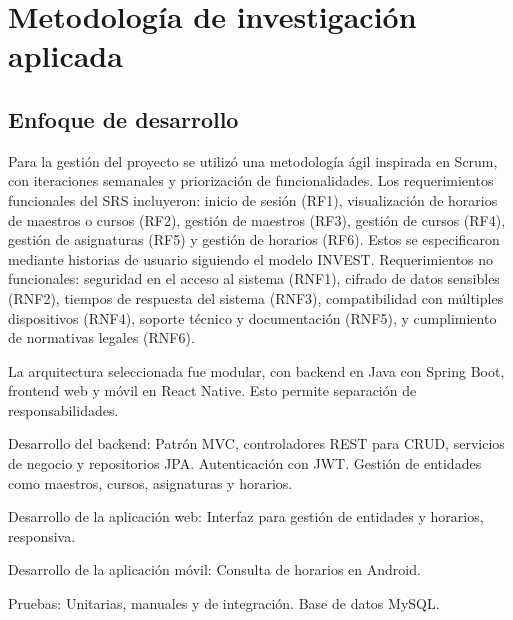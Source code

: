 \section{Metodología de investigación aplicada}
\subsection{Enfoque de desarrollo}
Para la gestión del proyecto se utilizó una metodología ágil inspirada en Scrum, con iteraciones semanales y priorización de funcionalidades. Los requerimientos funcionales del SRS incluyeron: inicio de sesión (RF1), visualización de horarios de maestros o cursos (RF2), gestión de maestros (RF3), gestión de cursos (RF4), gestión de asignaturas (RF5) y gestión de horarios (RF6). Estos se especificaron mediante historias de usuario siguiendo el modelo INVEST. Requerimientos no funcionales: seguridad en el acceso al sistema (RNF1), cifrado de datos sensibles (RNF2), tiempos de respuesta del sistema (RNF3), compatibilidad con múltiples dispositivos (RNF4), soporte técnico y documentación (RNF5), y cumplimiento de normativas legales (RNF6).

La arquitectura seleccionada fue modular, con backend en Java con Spring Boot, frontend web y móvil en React Native. Esto permite separación de responsabilidades.

Desarrollo del backend: Patrón MVC, controladores REST para CRUD, servicios de negocio y repositorios JPA. Autenticación con JWT. Gestión de entidades como maestros, cursos, asignaturas y horarios.

Desarrollo de la aplicación web: Interfaz para gestión de entidades y horarios, responsiva.

Desarrollo de la aplicación móvil: Consulta de horarios en Android.

Pruebas: Unitarias, manuales y de integración. Base de datos MySQL.